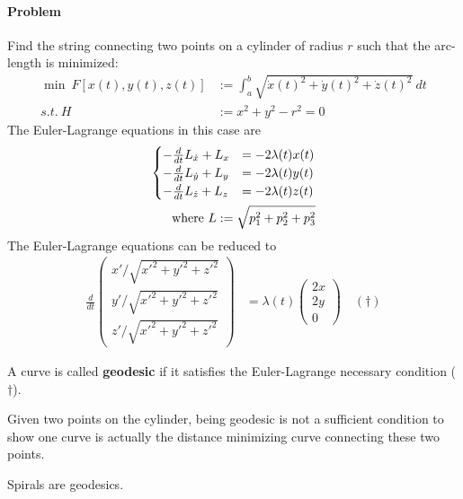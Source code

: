 \documentclass{article}
\begin{document}
	\paragraph{Problem} Find the string connecting two points on a cylinder of radius $r$ such that the arc-length is minimized:
	\begin{align}
		\min\ F[x(t), y(t), z(t)] &:= \int_a^b \sqrt{\dot{x}(t)^2 + \dot{y}(t)^2 + \dot{z}(t)^2}\ dt \\
		s.t.\ H &:= x^2 + y^2 - r^2 = 0
	\end{align}
	The Euler-Lagrange equations in this case are
	\begin{align}
		\begin{cases}
			- \frac{d}{dt}L_{\dot{x}} + L_x &= - 2 \lambda(t) x(t) \\
			- \frac{d}{dt}L_{\dot{y}} + L_y &= - 2 \lambda(t) y(t) \\
			- \frac{d}{dt}L_{\dot{z}} + L_z &= - 2 \lambda(t) z(t)
		\end{cases} \\
		\text{{where }} L := \sqrt{p_1^2 + p_2^2 + p_3^2}
	\end{align}
	The Euler-Lagrange equations can be reduced to
	\begin{align}
		\frac{d}{dt}
		\begin{pmatrix}
			x' / \sqrt{x'^2 + y'^2 + z'^2} \\
			y' / \sqrt{x'^2 + y'^2 + z'^2} \\
			z' / \sqrt{x'^2 + y'^2 + z'^2}
		\end{pmatrix} &= \lambda(t)
		\begin{pmatrix}
			2 x \\ 2y \\ 0
		\end{pmatrix}  \quad (\dagger)
	\end{align}
	
	\begin{definition}
		A curve is called \textbf{geodesic} if it satisfies the Euler-Lagrange necessary condition ($\dagger$).
	\end{definition}
	
	\begin{definition}
		Given two points on the cylinder, being geodesic is not a sufficient condition to show one curve is actually the distance minimizing curve connecting these two points.
	\end{definition}
	
	\begin{example}
		Spirals are geodesics.
	\end{example}
	
\end{document}
